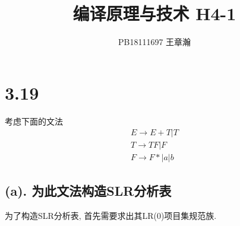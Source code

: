 \documentclass[UTF8]{article}
\title{编译原理与技术 H4-1}
\date{}
\author{PB18111697 王章瀚}
\begin{document}
\maketitle
\section*{3.19}
\noindent 考虑下面的文法
$$\begin{array}{l}
E\rightarrow E+T|T\\
T\rightarrow TF|F\\
F\rightarrow F*|a|b
\end{array}$$
\subsection*{(a). 为此文法构造SLR分析表}
\noindent 为了构造SLR分析表, 首先需要求出其LR(0)项目集规范族.\\
\end{document}

